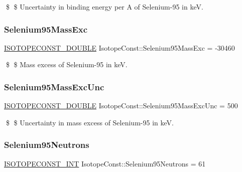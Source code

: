 \$ \$ Uncertainty in binding energy per A of Selenium-\/95 in keV. \mbox{\label{group___isotope_const-_selenium-_se95_ga906ecf1375985af45551bf6cf8c4601f}} 
\subsubsection{\texorpdfstring{Selenium95\+Mass\+Exc}{Selenium95MassExc}}
{\footnotesize\ttfamily \mbox{\hyperlink{group___isotope_const-_macros_ga8f45a7272ce02c0b4c65c44636ed719a}{I\+S\+O\+T\+O\+P\+E\+C\+O\+N\+S\+T\+\_\+\+D\+O\+U\+B\+LE}} Isotope\+Const\+::\+Selenium95\+Mass\+Exc = -\/30460}

\$ \$ Mass excess of Selenium-\/95 in keV. \mbox{\label{group___isotope_const-_selenium-_se95_ga133bf3f6c3099448cafd502560a32710}} 
\subsubsection{\texorpdfstring{Selenium95\+Mass\+Exc\+Unc}{Selenium95MassExcUnc}}
{\footnotesize\ttfamily \mbox{\hyperlink{group___isotope_const-_macros_ga8f45a7272ce02c0b4c65c44636ed719a}{I\+S\+O\+T\+O\+P\+E\+C\+O\+N\+S\+T\+\_\+\+D\+O\+U\+B\+LE}} Isotope\+Const\+::\+Selenium95\+Mass\+Exc\+Unc = 500}

\$ \$ Uncertainty in mass excess of Selenium-\/95 in keV. \mbox{\label{group___isotope_const-_selenium-_se95_ga1e548da4afe6e2660d5bba841535a945}} 
\subsubsection{\texorpdfstring{Selenium95\+Neutrons}{Selenium95Neutrons}}
{\footnotesize\ttfamily \mbox{\hyperlink{group___isotope_const-_macros_ga5f18360b3e99483a35c32d789e62621c}{I\+S\+O\+T\+O\+P\+E\+C\+O\+N\+S\+T\+\_\+\+I\+NT}} Isotope\+Const\+::\+Selenium95\+Neutrons = 61}

